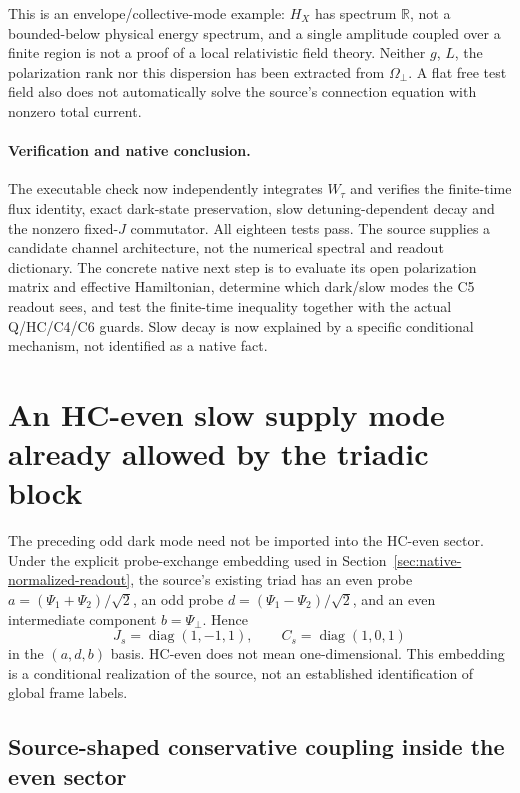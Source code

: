 \documentclass[11pt,a4paper]{article}
\begin{document}
This is an envelope/collective-mode example: $H_X$ has spectrum
$\mathbb R$, not a bounded-below physical energy spectrum, and a
single amplitude coupled over a finite region is not a proof of a
local relativistic field theory. Neither $g$, $L$, the polarization
rank nor this dispersion has been extracted from $\Omega_\perp$.
A flat free test field also does not automatically solve the
source's connection equation with nonzero total current.

\paragraph{Verification and native conclusion.}
The executable check now independently integrates $W_\tau$ and
verifies the finite-time flux identity, exact dark-state preservation,
slow detuning-dependent decay and the nonzero fixed-$J$ commutator.
All eighteen tests pass. The source supplies a candidate channel
architecture, not the numerical spectral and readout dictionary.
The concrete native next step is to evaluate its open polarization
matrix and effective Hamiltonian, determine which dark/slow modes
the C5 readout sees, and test the finite-time inequality together
with the actual Q/HC/C4/C6 guards. Slow decay is now explained by a
specific conditional mechanism, not identified as a native fact.

\section{An HC-even slow supply mode already allowed by the triadic block}
\label{sec:hc-even-slow-supply}

The preceding odd dark mode need not be imported into the HC-even
sector. Under the explicit probe-exchange embedding used in
Section~\ref{sec:native-normalized-readout}, the source's existing
triad has an even probe $a=(\Psi_1+\Psi_2)/\sqrt2$, an odd probe
$d=(\Psi_1-\Psi_2)/\sqrt2$, and an even intermediate component
$b=\Psi_\perp$. Hence
\[
 J_s=\operatorname{diag}(1,-1,1),\qquad
 C_s=\operatorname{diag}(1,0,1)
\]
in the $(a,d,b)$ basis. HC-even does not mean one-dimensional.
This embedding is a conditional realization of the source, not
an established identification of global frame labels.

\subsection{Source-shaped conservative coupling inside the even sector}
\end{document}
